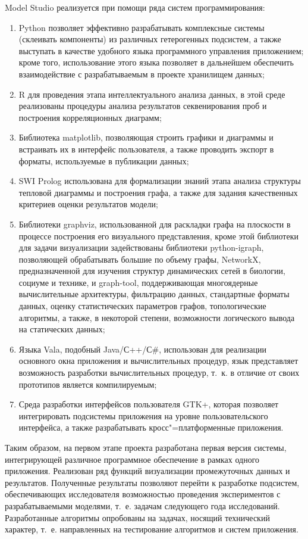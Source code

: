 \documentclass[a4paper,12pt,openany,final]{extreport}
\begin{document}
Model Studio реализуется при помощи ряда систем программирования:
\begin{enumerate}
\item Python позволяет эффективно разрабатывать комплексные системы (склеивать компоненты) из различных гетерогенных подсистем, а также выступать в качестве удобного языка программного управления приложением; кроме того, использование этого языка позволяет в дальнейшем обеспечить взаимодействие с разрабатываемым в проекте хранилищем данных;
\item R для проведения этапа интеллектуального анализа данных, в этой среде реализованы процедуры анализа результатов секвенирования проб и построения корреляционных диаграмм;
\item Библиотека matplotlib, позволяющая строить графики и диаграммы и встраивать их в интерфейс пользователя, а также проводить экспорт в форматы, используемые в публикации данных;
\item SWI Prolog использована для формализации знаний этапа анализа структуры тепловой диаграммы и построения графа, а также для задания качественных критериев оценки результатов модели;
\item Библиотеки graphviz, использованной для раскладки графа на плоскости в процессе построения его визуального представления, кроме этой библиотеки для задачи визуализации задействованы библиотеки python-igraph, позволяющей обрабатывать большие по объему графы, NetworkX, предназначенной для изучения структур динамических сетей в биологии, социуме и технике, и graph-tool, поддерживающая многоядерные вычислительные архитектуры, фильтрацию данных, стандартные форматы данных, оценку статистических параметров графов, топологические алгоритмы, а также, в некоторой степени, возможности логического вывода на статических данных;
\item Языка Vala, подобный Java/С++/С\#, использован для реализации основного окна приложения и вычислительных процедур, язык представляет возможность разработки вычислительных процедур, т.~к. в отличие от своих прототипов является компилируемым;
\item Среда разработки интерфейсов пользователя GTK+, которая позволяет интегрировать подсистемы приложения на уровне пользовательского интерфейса, а также разрабатывать кросс"=платформенные приложения.
\end{enumerate}

Таким образом, на первом этапе проекта разработана первая версия системы, интегрирующей различное программное обеспечение в рамках одного приложения. Реализован ряд функций визуализации промежуточных данных и результатов. Полученные результаты позволяют перейти к разработке подсистем, обеспечивающих исследователя возможностью проведения экспериментов с разрабатываемыми моделями, т.~е. задачам следующего года исследований. Разработанные алгоритмы опробованы на задачах, носящий технический характер, т.~е. направленных на тестирование алгоритмов и систем приложения.
\end{document}
